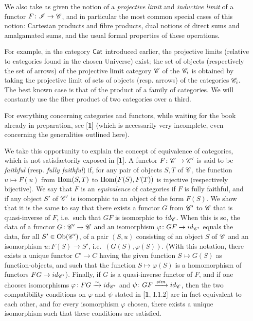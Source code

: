 We also take as given the notion of a \emph{projective limit} and \emph{inductive limit} of a functor $F \colon \mathscr{I} \to \mathscr{C}$, and in particular the most common special cases of this notion:
Cartesian products and fibre products, dual notions of direct sums and amalgamated sums, and the usual formal properties of these operations.

For example, in the category $\mathsf{Cat}$ introduced earlier, the projective limits
(relative to categories found in the chosen Universe) exist; the set of objects (respectively the set of arrows) of the projective limit category $\mathscr{C}$ of the $\mathscr{C}_i$ is obtained by taking the projective limit of sets of objects (resp. arrows) of the categories $\mathscr{C}_i$. The best known case is that of the product of a family of
categories. We will constantly use the fiber product of two categories
over a third.

For everything concerning categories and functors, while waiting for the book already in preparation, see [\textbf{1}] (which is necessarily very incomplete, even concerning the generalities outlined here).

We take this opportunity to explain the concept of equivalence of categories, which is not satisfactorily exposed in [\textbf{1}]. 
A functor $F \colon \mathscr{C} \to \mathscr{C}'$ is said to be \emph{faithful} (resp. \emph{fully faithful}) if, for any pair of objects $S, T$ of $\mathscr{C}$, the function $u \mapsto F (u)$ from $\mathrm{Hom} (S, T)$ to $\mathrm{Hom} (F (S), F (T))$ is injective (respectively bijective). 
We say that $F$ is an \emph{equivalence} of categories if $F$ is fully faithful, and if any object $S'$ of $\mathscr{C}'$ is isomorphic to an object of the form $F (S)$.
We show that it is the same to say that there exists a functor $G$ from $\mathscr{C}'$ to $\mathscr{C}$ that is quasi-inverse of $F$, i.e.\ such that $GF$ is isomorphic to $id_{\mathscr{C}}$.
When this is so, the data of a functor $G \colon \mathscr{C}' \to \mathscr{C}$ and an isomorphism $\varphi \colon GF \to id_{\mathscr{C}'}$ equals the data, for all $S' \in \mathrm{Ob} (\mathscr{C}')$, of a pair $(S, u)$ consisting of an object $S$ of $\mathscr{C}$ and an isomorphism $u \colon F (S) \to S'$, i.e.\ $(G (S), \varphi (S))$.
(With this notation, there exists a unique functor $C' \to C$ having the given function $S \mapsto G (S)$ as function-objects, and such that the function $S \mapsto \varphi (S)$ is a homomorphism of functors $FG \to id_{\mathscr{C}'}$).
Finally, if $G$ is a quasi-inverse functor of $F$, and if one chooses isomorphisms $\varphi \colon FG \xrightarrow{\sim} id_{\mathscr{C}'}$ and $\psi \colon GF \xrightarrow{sim} id_{\mathscr{C}}$, then the two compatibility conditions on $\varphi$ and $\psi$ stated in [\textbf{1}, I.1.2] are in fact equivalent to each other, and for every isomorphism $\varphi$ chosen, there exists a unique isomorphism such that these conditions are satisfied.


